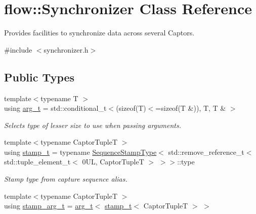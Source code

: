 \hypertarget{classflow_1_1_synchronizer}{}\section{flow\+:\+:Synchronizer Class Reference}
\label{classflow_1_1_synchronizer}


Provides facilities to synchronize data across several Captors.  




{\ttfamily \#include $<$synchronizer.\+h$>$}

\subsection*{Public Types}
\begin{DoxyCompactItemize}
\item 
\mbox{\label{classflow_1_1_synchronizer_a70d66cab3e69f69931cbaee6dbd5bdfb}} 
{\footnotesize template$<$typename T $>$ }\\using \hyperlink{classflow_1_1_synchronizer_a70d66cab3e69f69931cbaee6dbd5bdfb}{arg\+\_\+t} = std\+::conditional\+\_\+t$<$(sizeof(T)$<$=sizeof(T \&)), T, T \& $>$
\begin{DoxyCompactList}\small\item\em Selects type of lesser size to use when passing arguments. \end{DoxyCompactList}\item 
{\footnotesize template$<$typename Captor\+TupleT $>$ }\\using \hyperlink{classflow_1_1_synchronizer_a2a443abb40ad2413e6d5f7a7f3cfe4a7}{stamp\+\_\+t} = typename \hyperlink{structflow_1_1_sequence_stamp_type}{Sequence\+Stamp\+Type}$<$ std\+::remove\+\_\+reference\+\_\+t$<$ std\+::tuple\+\_\+element\+\_\+t$<$ 0\+U\+L, Captor\+Tuple\+T $>$ $>$$>$\+::type
\begin{DoxyCompactList}\small\item\em Stamp type from capture sequence alias. \end{DoxyCompactList}\item 
{\footnotesize template$<$typename Captor\+TupleT $>$ }\\using \hyperlink{classflow_1_1_synchronizer_a0f1e7062475c9492191e29b26d09106c}{stamp\+\_\+arg\+\_\+t} = \hyperlink{classflow_1_1_synchronizer_a70d66cab3e69f69931cbaee6dbd5bdfb}{arg\+\_\+t}$<$ \hyperlink{classflow_1_1_synchronizer_a2a443abb40ad2413e6d5f7a7f3cfe4a7}{stamp\+\_\+t}$<$ Captor\+TupleT $>$ $>$
$$
\end{DoxyCompactItemize}
